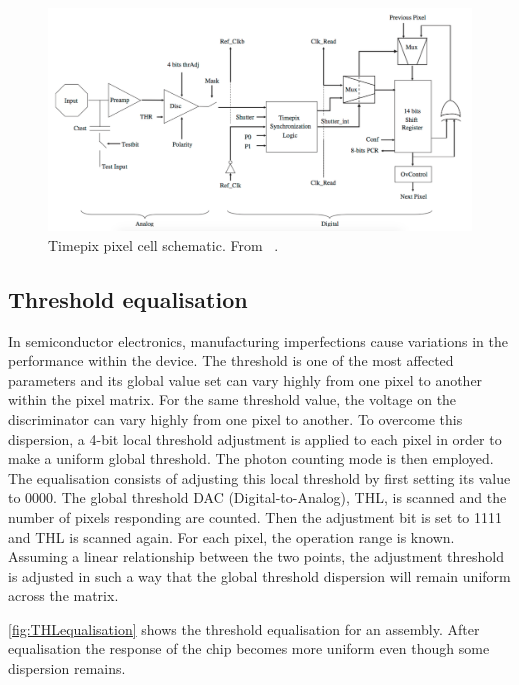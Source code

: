 \begin{figure}[htbp] 
  \centering
  \includegraphics[width=\textwidth]{./figures/Calibration/Timepix_pixel_cell_schematic.jpg}
  \caption{Timepix pixel cell schematic. From ~\cite{art:tmpx}.}
  \label{fig:Timepix_pixel_cell_schematic}
\end{figure}

\subsection{Threshold equalisation} \label{sec:ThresholdEqualisation}
In semiconductor electronics, manufacturing imperfections cause
variations in the performance within the device. The threshold is one
of the most affected parameters and its global value set can vary
highly from one pixel to another within the pixel matrix. For the same
threshold value, the voltage on the discriminator can vary highly from
one pixel to another. To overcome this dispersion, a 4-bit local
threshold adjustment is applied to each pixel in order to make a
uniform global threshold. The photon counting mode is then
employed. The equalisation consists of adjusting this local threshold
by first setting its value to 0000. The global threshold DAC
(Digital-to-Analog), THL, is scanned and the number of pixels
responding are counted. Then the adjustment bit is set to 1111 and THL
is scanned again. For each pixel, the operation range is
known. Assuming a linear relationship between the two points, the
adjustment threshold is adjusted in such a way that the global
threshold dispersion will remain uniform across the matrix.

\cref{fig:THLequalisation} shows the threshold equalisation for an
assembly. After equalisation the response of the chip becomes more
uniform even though some dispersion remains.

